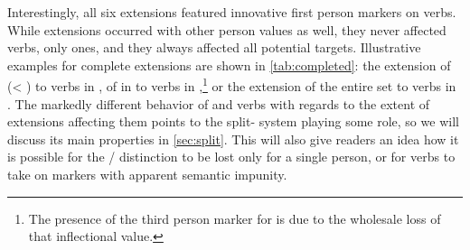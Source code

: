 Interestingly, all six extensions featured innovative first person markers on  verbs.
While extensions occurred with other person values as well, they never affected  verbs, only  ones, and they always affected all potential targets.
Illustrative examples for complete extensions are shown in \cref{tab:completed}: the extension of   (< ) to  verbs in \apalai {}, of   in to  verbs in \panare {},\footnote{The presence of the third person marker  for  is due to the wholesale loss of that inflectional value.} or the extension of the entire  set to  verbs in \waimiri {}. %
The markedly different behavior of  and  verbs with regards to the extent of extensions affecting them points to the split- system playing some role, so we will discuss its main properties in \cref{sec:split}.
This will also give readers an idea how it is possible for the / distinction to be lost only for a single person, or for  verbs to take on  markers with apparent semantic impunity.



